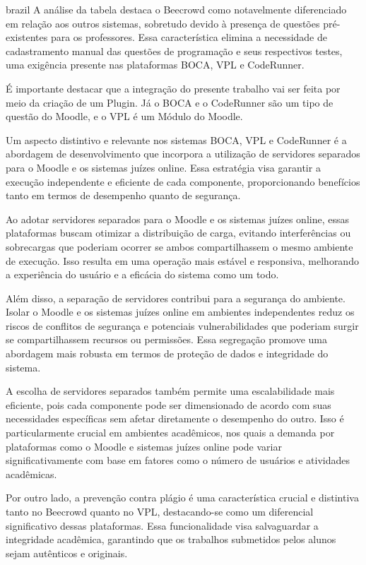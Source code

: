 \begin{otherlanguage*}{brazil}
A análise da tabela destaca o Beecrowd como notavelmente diferenciado em relação aos outros sistemas, sobretudo devido à presença de questões pré-existentes para os professores. Essa característica elimina a necessidade de cadastramento manual das questões de programação e seus respectivos testes, uma exigência presente nas plataformas BOCA, VPL e CodeRunner.

É importante destacar que a integração do presente trabalho vai ser feita por meio da criação de um Plugin. Já o BOCA e o CodeRunner são um tipo de questão do Moodle, e o VPL é um Módulo do Moodle.

Um aspecto distintivo e relevante nos sistemas BOCA, VPL e CodeRunner é a abordagem de desenvolvimento que incorpora a utilização de servidores separados para o Moodle e os sistemas juízes online. Essa estratégia visa garantir a execução independente e eficiente de cada componente, proporcionando benefícios tanto em termos de desempenho quanto de segurança.

Ao adotar servidores separados para o Moodle e os sistemas juízes online, essas plataformas buscam otimizar a distribuição de carga, evitando interferências ou sobrecargas que poderiam ocorrer se ambos compartilhassem o mesmo ambiente de execução. Isso resulta em uma operação mais estável e responsiva, melhorando a experiência do usuário e a eficácia do sistema como um todo.

Além disso, a separação de servidores contribui para a segurança do ambiente. Isolar o Moodle e os sistemas juízes online em ambientes independentes reduz os riscos de conflitos de segurança e potenciais vulnerabilidades que poderiam surgir se compartilhassem recursos ou permissões. Essa segregação promove uma abordagem mais robusta em termos de proteção de dados e integridade do sistema.

A escolha de servidores separados também permite uma escalabilidade mais eficiente, pois cada componente pode ser dimensionado de acordo com suas necessidades específicas sem afetar diretamente o desempenho do outro. Isso é particularmente crucial em ambientes acadêmicos, nos quais a demanda por plataformas como o Moodle e sistemas juízes online pode variar significativamente com base em fatores como o número de usuários e atividades acadêmicas.

Por outro lado, a prevenção contra plágio é uma característica crucial e distintiva tanto no Beecrowd quanto no VPL, destacando-se como um diferencial significativo dessas plataformas. Essa funcionalidade visa salvaguardar a integridade acadêmica, garantindo que os trabalhos submetidos pelos alunos sejam autênticos e originais.


\end{otherlanguage*}
